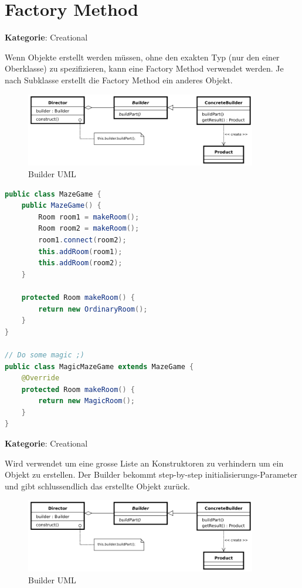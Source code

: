 \section{Factory Method}
\textbf{Kategorie}: Creational

Wenn Objekte erstellt werden müssen, ohne den exakten Typ (nur den einer Oberklasse) zu spezifizieren, kann eine Factory Method verwendet werden.
Je nach Subklasse erstellt die Factory Method ein anderes Objekt.

\begin{figure}[H]
	\centering
	\includegraphics[width=0.9\textwidth]{content/gof/images/04-builder-uml.png}
	\caption{Builder UML}
\end{figure}

\begin{lstlisting}[language=Java, caption={Factory Method}]
public class MazeGame {
	public MazeGame() {
		Room room1 = makeRoom();
		Room room2 = makeRoom();
		room1.connect(room2);
		this.addRoom(room1);
		this.addRoom(room2);
	}

	protected Room makeRoom() {
		return new OrdinaryRoom();
	}
}

// Do some magic ;)
public class MagicMazeGame extends MazeGame {
	@Override
	protected Room makeRoom() {
		return new MagicRoom();
	}
}
\end{lstlisting}

\textbf{Kategorie}: Creational

Wird verwendet um eine grosse Liste an Konstruktoren zu verhindern um ein Objekt zu erstellen. Der Builder bekommt step-by-step initialisierungs-Parameter und gibt schlussendlich das erstellte Objekt zurück.

\begin{figure}[H]
	\centering
	\includegraphics[width=0.9\textwidth]{content/gof/images/04-builder-uml.png}
	\caption{Builder UML}
\end{figure}


